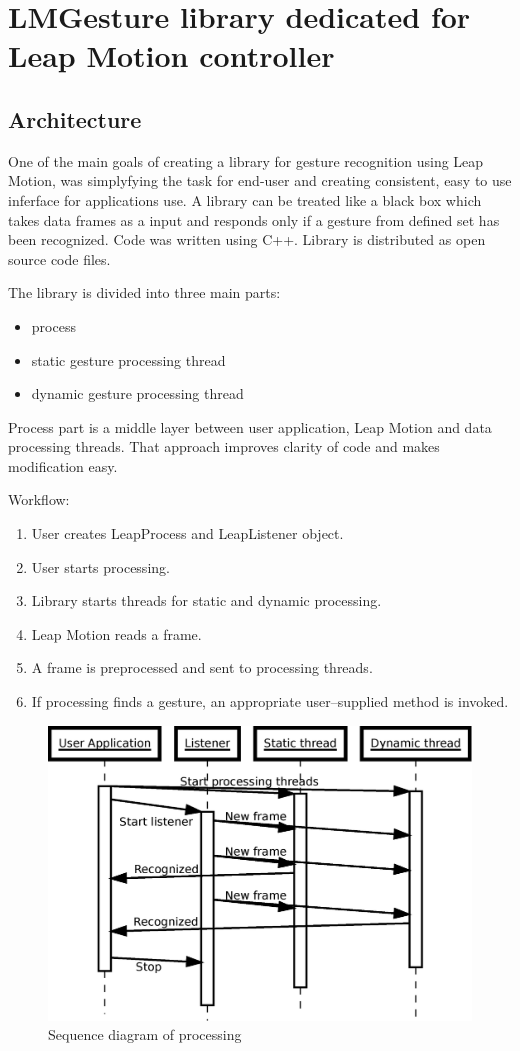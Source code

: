 
\chapter{LMGesture library dedicated for Leap Motion controller}

\section{Architecture}

One of the main goals of creating a library for gesture recognition using Leap Motion, was simplyfying the task for end-user and creating consistent, easy to use inferface for applications use. A library can be treated like a black box which takes data frames as a input and responds only if a gesture from defined set has been recognized. Code was written using C++. Library is distributed as open source code files.

The library is divided into three main parts:
\begin{itemize}
\item process
\item static gesture processing thread
\item dynamic gesture processing thread
\end{itemize}

Process part is a middle layer between user application, Leap Motion and data processing threads. That approach improves clarity of code and makes modification easy.

Workflow:
\begin{enumerate}
  \item User creates LeapProcess and LeapListener object.
  \item User starts processing.
  \item Library starts threads for static and dynamic processing.
  \item Leap Motion reads a frame.
  \item A frame is preprocessed and sent to processing threads.
  \item If processing finds a gesture, an appropriate user--supplied method is invoked.
\end{enumerate}

\begin{figure}[htb]
\centering
 \includegraphics[width=0.8\columnwidth]{figures/timeline.eps}
 \caption[]{Sequence diagram of processing}
 \label{processingtimeline}
\end{figure}

